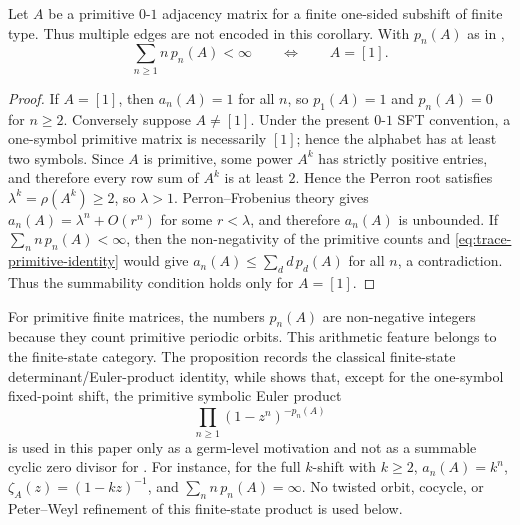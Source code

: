 \begin{corollary}
  \label{cor:primitive-symbolic-summability-exclusion}
  Let \(A\) be a primitive \(0\)-\(1\) adjacency matrix for a finite
  one-sided subshift of finite type. Thus multiple edges are not encoded in
  this corollary. With \(p_n(A)\) as in
  ,
  \[
    \sum_{n\ge1} n\,p_n(A)<\infty
    \qquad\Longleftrightarrow\qquad
    A=[1].
  \]
\end{corollary}

\begin{proof}
  If \(A=[1]\), then \(a_n(A)=1\) for all \(n\), so \(p_1(A)=1\) and
  \(p_n(A)=0\) for \(n\ge2\). Conversely suppose \(A\ne[1]\). Under the
  present \(0\)-\(1\) SFT convention, a one-symbol primitive matrix is
  necessarily \([1]\); hence the alphabet has at least two symbols. Since
  \(A\) is primitive, some power \(A^k\) has strictly positive entries, and
  therefore every row sum of \(A^k\) is at least \(2\). Hence the Perron root
  satisfies \(\lambda^k=\rho(A^k)\ge2\),
  so \(\lambda>1\). Perron--Frobenius theory gives
  \(a_n(A)=\lambda^n+O(r^n)\) for some \(r<\lambda\), and therefore
  \(a_n(A)\) is unbounded. If \(\sum_n n\,p_n(A)<\infty\), then the
  non-negativity of the primitive counts and
  \eqref{eq:trace-primitive-identity} would give
  \(a_n(A)\le\sum_d d\,p_d(A)\) for all \(n\), a contradiction. Thus the
  summability condition holds only for \(A=[1]\).
\end{proof}

\begin{remark}
  \label{rem:symbolic-product-role}
  For primitive finite matrices, the numbers \(p_n(A)\) are non-negative
  integers because they count primitive periodic orbits. This arithmetic
  feature belongs to the finite-state category. The proposition records the
  classical finite-state determinant/Euler-product identity, while
   shows that,
  except for the one-symbol fixed-point shift, the primitive symbolic Euler
  product
  \[
    \prod_{n\ge1}(1-z^n)^{-p_n(A)}
  \]
  is used in this paper only as a germ-level motivation and not as a
  summable cyclic zero divisor for
  . For instance, for the full
  \(k\)-shift with \(k\ge2\), \(a_n(A)=k^n\),
  \(\zeta_A(z)=(1-kz)^{-1}\), and
  \(\sum_n n\,p_n(A)=\infty\).  No twisted orbit, cocycle, or
  Peter--Weyl refinement of this finite-state product is used below.
\end{remark}
